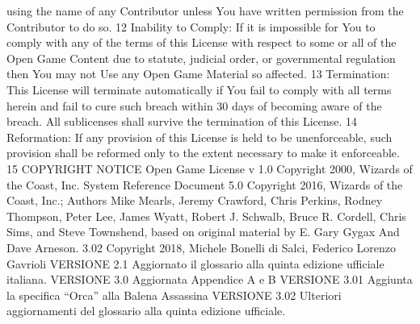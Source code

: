 \begin{multicols}{2}
using the name of any Contributor unless You
have written permission from the Contributor to
do so.
12 Inability to Comply: If it is impossible for You
to comply with any of the terms of this License
with respect to some or all of the Open Game
Content due to statute, judicial order, or
governmental regulation then You may not Use
any Open Game Material so affected.
13 Termination: This License will terminate
automatically if You fail to comply with all terms
herein and fail to cure such breach within 30 days
of becoming aware of the breach. All sublicenses
shall survive the termination of this License.
14 Reformation: If any provision of this License is
held to be unenforceable, such provision shall be
reformed only to the extent necessary to make it
enforceable.
15 COPYRIGHT NOTICE
Open Game License v 1.0 Copyright 2000,
Wizards of the Coast, Inc.
System Reference Document 5.0 Copyright 2016,
Wizards of the Coast, Inc.; Authors Mike Mearls,
Jeremy Crawford, Chris Perkins, Rodney Thompson,
Peter Lee, James Wyatt, Robert J. Schwalb, Bruce R.
Cordell, Chris Sims, and Steve Townshend, based on
original material by E. Gary Gygax And Dave
Arneson.
 3.02 Copyright 2018, Michele
Bonelli di Salci, Federico Lorenzo Gavrioli
VERSIONE 2.1
Aggiornato il glossario alla quinta edizione ufficiale
italiana.
VERSIONE 3.0
Aggiornata Appendice A e B
VERSIONE 3.01
Aggiunta la specifica “Orca” alla Balena Assassina
VERSIONE 3.02
Ulteriori aggiornamenti del glossario alla quinta
edizione ufficiale.

\end{multicols}